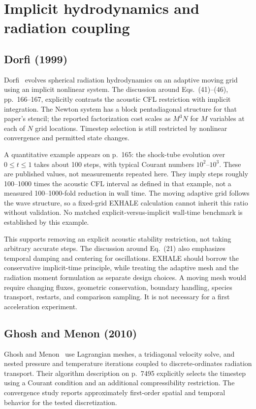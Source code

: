 \documentclass[english,a4paper]{my_memo}
\begin{document}
\section{Implicit hydrodynamics and radiation coupling}
\subsection{Dorfi (1999)}
Dorfi\ \cite{dorfi} evolves spherical radiation hydrodynamics on an adaptive moving grid using an implicit nonlinear system. The discussion around Eqs.~(41)--(46), pp.~166--167, explicitly contrasts the acoustic CFL restriction with implicit integration. The Newton system has a block pentadiagonal structure for that paper's stencil; the reported factorization cost scales as $M^3N$ for $M$ variables at each of $N$ grid locations. Timestep selection is still restricted by nonlinear convergence and permitted state changes.

A quantitative example appears on p.~165: the shock-tube evolution over $0\leq t\leq1$ takes about 100 steps, with typical Courant numbers $10^2$--$10^3$. These are published values, not measurements repeated here. They imply steps roughly 100--1000 times the acoustic CFL interval as defined in that example, not a measured 100--1000-fold reduction in wall time. The moving adaptive grid follows the wave structure, so a fixed-grid EXHALE calculation cannot inherit this ratio without validation. No matched explicit-versus-implicit wall-time benchmark is established by this example.

This supports removing an explicit acoustic stability restriction, not taking arbitrary accurate steps. The discussion around Eq.~(21) also emphasizes temporal damping and centering for oscillations. EXHALE should borrow the conservative implicit-time principle, while treating the adaptive mesh and the radiation moment formulation as separate design choices. A moving mesh would require changing fluxes, geometric conservation, boundary handling, species transport, restarts, and comparison sampling. It is not necessary for a first acceleration experiment.

\subsection{Ghosh and Menon (2010)}
Ghosh and Menon\ \cite{ghosh} use Lagrangian meshes, a tridiagonal velocity solve, and nested pressure and temperature iterations coupled to discrete-ordinates radiation transport. Their algorithm description on p.~7495 explicitly selects the timestep using a Courant condition and an additional compressibility restriction. The convergence study reports approximately first-order spatial and temporal behavior for the tested discretization.
\end{document}
